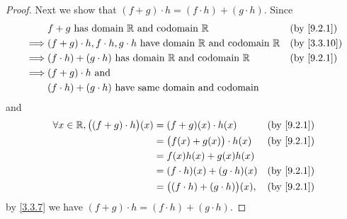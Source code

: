 \begin{proof}
  Next we show that \((f + g) \cdot h = (f \cdot h) + (g \cdot h)\).
  Since
  \begin{align*}
             & f + g \text{ has domain } \R \text{ and codomain } \R                                   &  & \by{9.2.1}  \\
    \implies & (f + g) \cdot h, f \cdot h, g \cdot h  \text{ have domain } \R \text{ and codomain } \R &  & \by{3.3.10} \\
    \implies & (f \cdot h) + (g \cdot h)  \text{ has domain } \R \text{ and codomain } \R              &  & \by{9.2.1}  \\
    \implies & (f + g) \cdot h \text{ and }                                                                             \\
             & (f \cdot h) + (g \cdot h) \text{ have same domain and codomain}
  \end{align*}
  and
  \begin{align*}
    \forall x \in \R, \big((f + g) \cdot h\big)(x) & = (f + g)(x) \cdot h(x)                   &  & \by{9.2.1} \\
                                                   & = \big(f(x) + g(x)\big) \cdot h(x)        &  & \by{9.2.1} \\
                                                   & = f(x)h(x) + g(x)h(x)                                     \\
                                                   & = (f \cdot h)(x) + (g \cdot h)(x)         &  & \by{9.2.1} \\
                                                   & = \big((f \cdot h) + (g \cdot h)\big)(x), &  & \by{9.2.1}
  \end{align*}
  by \cref{3.3.7} we have \((f + g) \cdot h = (f \cdot h) + (g \cdot h)\).


\end{proof}

